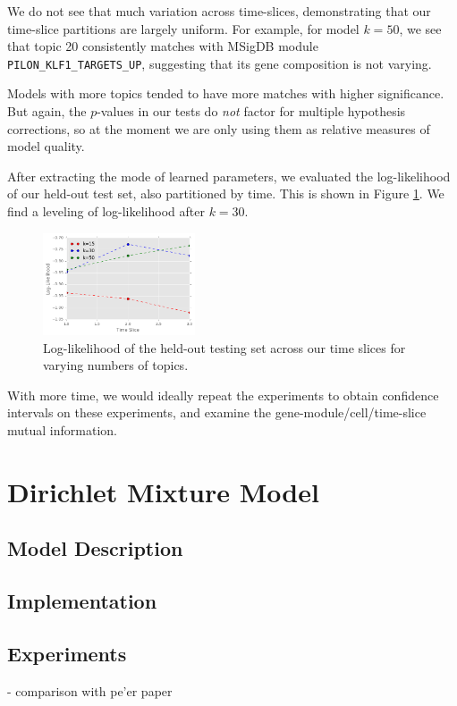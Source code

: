 \documentclass{article}
\begin{document}
We do not see that much variation across time-slices, demonstrating that our time-slice partitions are largely uniform. For example, for model $k=50$, we see that topic 20 consistently matches with MSigDB module \texttt{PILON\_KLF1\_TARGETS\_UP}, suggesting that its gene composition is not varying.

Models with more topics tended to have more matches with higher significance. But again, the $p$-values in our tests do \textit{not} factor for multiple hypothesis corrections, so at the moment we are only using them as relative measures of model quality.

After extracting the mode of learned parameters, we evaluated the log-likelihood of our held-out test set, also partitioned by time. This is shown in Figure \ref{fig:lldtm}. We find a leveling of log-likelihood after $k=30$.

\begin{figure}
    \centering
    \includegraphics[width=0.4\textwidth]{figs/lldtm}
    \caption{Log-likelihood of the held-out testing set across our time slices for varying numbers of topics.}
    \label{fig:lldtm}
\vskip -0.2in
\end{figure}

With more time, we would ideally repeat the experiments to obtain confidence intervals on these experiments, and examine the gene-module/cell/time-slice mutual information.

\section{Dirichlet Mixture Model} 
\label{mmsec}
\subsection{Model Description} 
\subsection{Implementation} 
\subsection{Experiments}  
- comparison with pe'er paper
\end{document}
